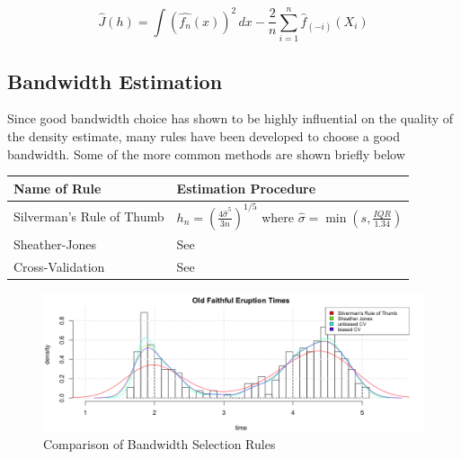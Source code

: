 \documentclass[12pt]{article}
\begin{document}
\begin{equation}
\label{est_risk}
\hat J(h) = \int \left(\hat{f_n}(x)\right)^2 \, dx - \frac{2}{n} \sum^{n}_{i=1}{ \hat{f}_{(-i)}(X_i)}
\end{equation}

\subsection{Bandwidth Estimation}\label{bandwidth-estimation}

Since good bandwidth choice has shown to be highly influential on the
quality of the density estimate, many rules have been developed to
choose a good bandwidth. Some of the more common methods are shown
briefly below

\begin{longtable}[]{@{}ll@{}}
\toprule
\begin{minipage}[b]{0.37\columnwidth}\raggedright\strut
Name of Rule\strut
\end{minipage} & \begin{minipage}[b]{0.57\columnwidth}\raggedright\strut
Estimation Procedure\strut
\end{minipage}\tabularnewline
\midrule
\endhead
\begin{minipage}[t]{0.37\columnwidth}\raggedright\strut
Silverman's Rule of Thumb\strut
\end{minipage} & \begin{minipage}[t]{0.57\columnwidth}\raggedright\strut
\(h_n = \left( \frac{4 \hat{\sigma}^5}{3n}\right)^{1/5}\) where
\(\hat\sigma = \min\left(s, \frac{IQR}{1.34}\right)\)\strut
\end{minipage}\tabularnewline
\begin{minipage}[t]{0.37\columnwidth}\raggedright\strut
Sheather-Jones\strut
\end{minipage} & \begin{minipage}[t]{0.57\columnwidth}\raggedright\strut
See \citep{SJ}\strut
\end{minipage}\tabularnewline
\begin{minipage}[t]{0.37\columnwidth}\raggedright\strut
Cross-Validation\strut
\end{minipage} & \begin{minipage}[t]{0.57\columnwidth}\raggedright\strut
See \citep{scott_terrell}\strut
\end{minipage}\tabularnewline
\bottomrule
\end{longtable}

\begin{figure}[h]
\label{fig:bw_selection}
\caption{Comparison of Bandwidth Selection Rules}
\includegraphics[scale=.5]{bw_selection}
\centering
\end{figure}
\end{document}
